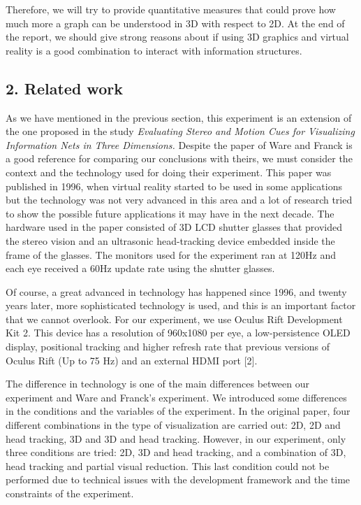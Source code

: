 Therefore, we will try to provide quantitative measures that could prove
how much more a graph can be understood in 3D with respect to 2D. At the
end of the report, we should give strong reasons about if using 3D
graphics and virtual reality is a good combination to interact with
information structures.

\subsection{2. Related work}\label{related-work}

As we have mentioned in the previous section, this experiment is an
extension of the one proposed in the study \emph{Evaluating Stereo and
Motion Cues for Visualizing Information Nets in Three Dimensions.}
Despite the paper of Ware and Franck is a good reference for comparing
our conclusions with theirs, we must consider the context and the
technology used for doing their experiment. This paper was published in
1996, when virtual reality started to be used in some applications but
the technology was not very advanced in this area and a lot of research
tried to show the possible future applications it may have in the next
decade. The hardware used in the paper consisted of 3D LCD shutter
glasses that provided the stereo vision and an ultrasonic head-tracking
device embedded inside the frame of the glasses. The monitors used for
the experiment ran at 120Hz and each eye received a 60Hz update rate
using the shutter glasses.

Of course, a great advanced in technology has happened since 1996, and
twenty years later, more sophisticated technology is used, and this is
an important factor that we cannot overlook. For our experiment, we use
Oculus Rift Development Kit 2. This device has a resolution of 960x1080
per eye, a low-persistence OLED display, positional tracking and higher
refresh rate that previous versions of Oculus Rift (Up to 75 Hz) and an
external HDMI port {[}2{]}.

The difference in technology is one of the main differences between our
experiment and Ware and Franck's experiment. We introduced some
differences in the conditions and the variables of the experiment. In
the original paper, four different combinations in the type of
visualization are carried out: 2D, 2D and head tracking, 3D and 3D and
head tracking. However, in our experiment, only three conditions are
tried: 2D, 3D and head tracking, and a combination of 3D, head tracking
and partial visual reduction. This last condition could not be performed
due to technical issues with the development framework and the time
constraints of the experiment.

